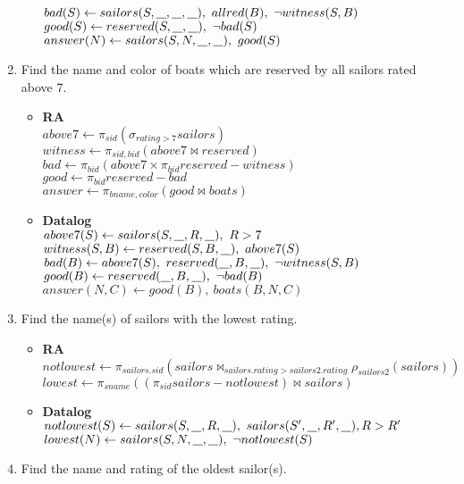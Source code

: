\documentclass{article}
\newcommand{\anyvar}{\underline{\hspace{0.8em}}}
\newcommand{\RA}{\textbf{RA}}
\newcommand{\DL}{\textbf{Datalog}}
\begin{document}
\begin{enumerate}
\begin{itemize}
	$ bad(S) \gets sailors(S, \anyvar, \anyvar, \anyvar),\ allred(B),\ \neg witness(S, B) $ \\
	$ good(S) \gets reserved(S, \anyvar, \anyvar),\ \neg bad(S) $ \\
	$ answer(N) \gets sailors(S, N, \anyvar, \anyvar),\ good(S) $
	\end{itemize}
\item Find the name and color of boats which are reserved by all sailors rated above 7.
	\begin{itemize}
	\item \RA \\
	$ above7 \gets \pi_{sid}(\sigma_{rating > 7} sailors) $ \\
	$ witness \gets \pi_{sid, bid}(above7 \bowtie reserved) $ \\
	$ bad \gets \pi_{bid}(above7 \times \pi_{bid}reserved - witness) $ \\
	$ good \gets \pi_{bid}reserved - bad$ \\
	$ answer \gets \pi_{bname, color}(good \bowtie boats)$
	\item \DL \\
	$ above7(S) \gets sailors(S, \anyvar, R, \anyvar), \ R > 7$ \\
	$ witness(S, B) \gets reserved(S, B, \anyvar),\ above7(S) $ \\
	$ bad(B) \gets above7(S),\ reserved(\anyvar, B, \anyvar),\ \neg witness(S, B) $ \\
	$ good(B) \gets reserved(\anyvar, B, \anyvar),\ \neg bad(B) $ \\
	$ answer(N, C) \gets good(B),\ boats(B, N, C) $
	\end{itemize}
\item Find the name(s) of sailors with the lowest rating.
	\begin{itemize}
	\item \RA \\
	$ notlowest \gets \pi_{sailors.sid}(sailors \bowtie_{sailors.rating > sailors2.rating} \rho_{sailors2} (sailors)) $ \\
	$ lowest \gets \pi_{sname}((\pi_{sid}sailors - notlowest) \bowtie sailors) $
	\item \DL \\
	$ notlowest(S) \gets sailors(S, \anyvar, R, \anyvar), \ sailors(S', \anyvar, R', \anyvar), R > R' $ \\
	$ lowest(N) \gets sailors(S, N, \anyvar, \anyvar), \ \neg notlowest(S) $
	\end{itemize}
\item Find the name and rating of the oldest sailor(s).

\end{enumerate}
\end{document}
